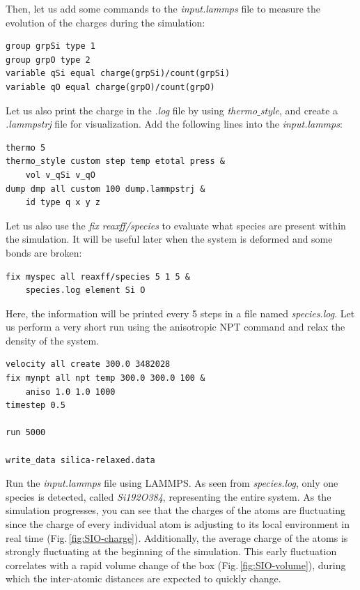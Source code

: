 \documentclass[9pt,tutorial]{livecoms}
\begin{document}
Then, let us add some commands to the \textit{input.lammps} file  to measure the evolution of the charges during the simulation:
{\normalsize \begin{verbatim}
group grpSi type 1
group grpO type 2
variable qSi equal charge(grpSi)/count(grpSi)
variable qO equal charge(grpO)/count(grpO)
\end{verbatim}}
Let us also print the charge in the \textit{.log} file by using \textit{thermo$\_$style}, and create a \textit{.lammpstrj} file for visualization. Add the following lines into the \textit{input.lammps}:
{\normalsize \begin{verbatim}
thermo 5
thermo_style custom step temp etotal press &
    vol v_qSi v_qO
dump dmp all custom 100 dump.lammpstrj &
    id type q x y z
\end{verbatim}}
Let us also use the \textit{fix reaxff/species} to evaluate what species are present within the simulation. It will be useful later when the system is deformed and some bonds are broken:
{\normalsize \begin{verbatim}
fix myspec all reaxff/species 5 1 5 & 
    species.log element Si O
\end{verbatim}}
Here, the information will be printed every 5 steps in a file named \textit{species.log}.
Let us perform a very short run using the anisotropic NPT command and relax the density of the system. 
{\normalsize \begin{verbatim}
velocity all create 300.0 3482028
fix mynpt all npt temp 300.0 300.0 100 &
    aniso 1.0 1.0 1000
timestep 0.5

run 5000

write_data silica-relaxed.data
\end{verbatim}}
Run the \textit{input.lammps} file using LAMMPS. As seen from \textit{species.log}, only one species is detected, called \textit{Si192O384}, representing the entire system. As the simulation progresses, you can see that the charges of the atoms are fluctuating since the charge of every individual atom is adjusting to its local environment in real time (Fig.\,\ref{fig:SIO-charge}). Additionally, the average charge of the atoms is strongly fluctuating at the beginning of the simulation. This early fluctuation correlates with a rapid volume change of the box (Fig.\,\ref{fig:SIO-volume}), during which the inter-atomic distances are expected to quickly change.
\end{document}
